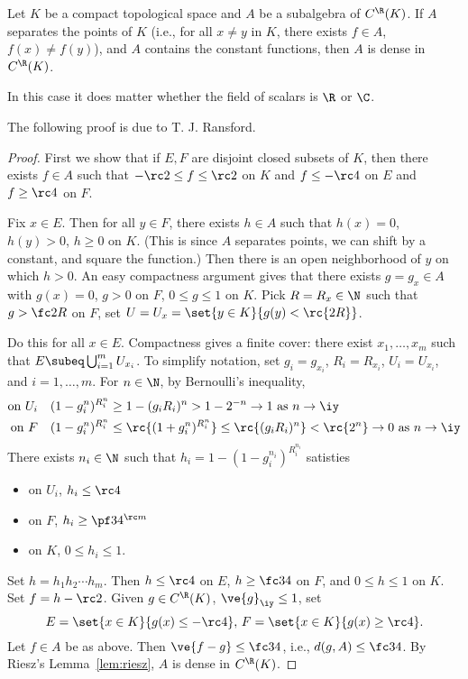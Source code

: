 \begin{thm}
Let $K$ be a compact topological space and $A$ be a subalgebra of $C^{\R}(K)$. If $A$ separates the points of $K$ (i.e., for all $x\ne y$ in $K$, there exists $f\in A$, $f(x)\ne f(y)$), and $A$ contains the constant functions, then $A$ is dense in $C^{\R}(K)$.
\end{thm}
In this case it does matter whether the field of scalars is $\R$ or $\C$.

The following proof is due to T. J. Ransford.
\begin{proof}
First we show that if $E,F$ are disjoint closed subsets of $K$, then there exists $f\in A$ such that $-\rc2\le f\le \rc2$ on $K$ and $f\le -\rc 4$ on $E$ and $f\ge \rc 4$ on $F$.

Fix $x\in E$. Then for all $y\in F$, there exists $h\in A$ such that $h(x)=0$, $h(y)>0$, $h\ge 0$ on $K$. (This is since $A$ separates points, we can shift by a constant, and square the function.) Then there is an open neighborhood of $y$ on which $h>0$.  %
An easy compactness argument gives that there exists $g=g_x\in A$ with $g(x)=0$, $g>0$ on $F$, 
$0\le g\le 1$ on $K$. 
Pick $R=R_x\in \N$ such that $g>\fc2R$ on $F$, set $U=U_x=\set{y\in K}{g(y)<\rc{2R}}$. 

Do this for all $x\in E$.
Compactness gives a finite cover: there exist $x_1,\ldots, x_m$ such that $E\subeq \bigcup_{i=1}^m U_{x_i}$. To simplify notation, set $g_i=g_{x_i}$, $R_i=R_{x_i}$, $U_i=U_{x_i}$, and $i=1,\ldots, m$. For $n\in \N$,  by Bernoulli's inequality,
\begin{align*}
\text{on }U_i&&
(1-g_i^n)^{R_i^n}&\ge 1-(g_iR_i)^n>1-2^{-n}\to 1\text{ as }n\to \iy\\
\text{on }F&&
(1-g_i^n)^{R_i^n}&\le \rc{(1+g_i^n)^{R_i^n}}\le \rc{(g_iR_i)^n}<\rc{2^n}\to 0\text{ as }n\to \iy
\end{align*}
There exists $n_i\in \N$ such that $h_i=1-(1-g_i^{n_i})^{R_i^{n_i}}$ satisties
\begin{itemize}
\item
on $U_i$, $h_i\le \rc 4$
\item
on $F$, $h_i\ge \pf 34^{\rc m}$
\item
on $K$, $0\le h_i\le 1$.
\end{itemize}
Set $h=h_1h_2\cdots h_m$. Then $h\le \rc 4$ on $E$, $h\ge \fc 34$ on $F$, and $0\le h\le 1$ on $K$. Set $f=h-\rc2$.
Given $g\in C^{\R}(K)$, $\ve{g}_{\iy}\le 1$, set
\[
E=\set{x\in K}{g(x)\le -\rc 4},\,F=\set{x\in K}{g(x)\ge \rc 4}.
\]
Let $f\in A$ be as above. Then $\ve{f-g}\le \fc 34$, i.e., $d(g,A)\le \fc 34$. By Riesz's Lemma~\ref{lem:riesz}, $A$ is dense in $C^{\R}(K)$.
\end{proof}

